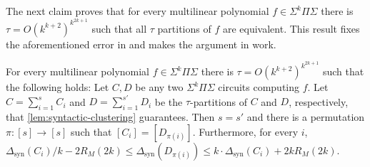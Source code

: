 \documentclass[12pt]{article}
\newcommand{\Sps}[1]{\Sigma^{#1} \Pi\Sigma}
\newcommand{\ranksyn}{\Delta_{\text{syn}}}
\begin{document}
	The next claim proves that for every multilinear polynomial $f \in \Sps{k}$ there is $\tau =O(k^{k+2})^{k^{2k+1}}$ such that all $\tau$ partitions of $f$ are equivalent. This result fixes the aforementioned error in \cite{KarninShpilka09} and makes the argument in \cite{BSV21} work.
	
	\begin{theorem}\label{thm:unique-syn-part}
		For every multilinear polynomial $f \in \Sps{k}$ there is $\tau =O(k^{k+2})^{k^{2k+1}}$ such that the following holds: Let $C,D$ be any two $\Sps{k}$ circuits computing $f$. Let $C=\sum_{i=1}^{s}C_i$ and $D=\sum_{i=1}^{s'}D_i$ be the $\tau$-partitions of $C$ and $D$, respectively, that \autoref{lem:syntactic-clustering} guarantees. Then $s=s'$ and there is a permutation $\pi:[s]\to[s]$ such that $[C_i]=[D_{\pi(i)}]$. Furthermore, for every $i$,  $\ranksyn(C_i)/k -2 R_M(2k)\le \ranksyn(D_{\pi(i)})\le  k \cdot \ranksyn(C_i)+2k R_M(2k)$. 
	\end{theorem}
	
\end{document}
